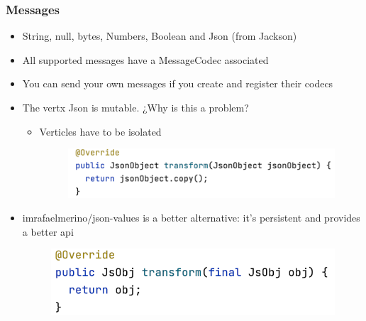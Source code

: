 \documentclass{beamer}
\begin{document}
\begin{frame}
\frametitle{Messages}
\begin{itemize}
\item<1-> String, null, bytes, Numbers, Boolean and Json (from Jackson)
\item<2-> All supported messages have a MessageCodec associated
\item<3-> You can send your own messages if you create and register their codecs
\item<4-> The vertx Json is mutable. ¿Why is this a problem?
\begin{itemize}
\item<5-> Verticles have to be isolated
\newline
\begin{figure}
\includegraphics[scale=0.5]{images/vertx-json-codec.png}
\end{figure}
\end{itemize}
\item<6->  imrafaelmerino/json-values is a better alternative: it's persistent and provides a better api
\newline
\begin{figure}
\includegraphics[scale=0.5]{images/jsvalues-codec.png}
\end{figure}
\end{itemize}
\end{frame}
\end{document}
